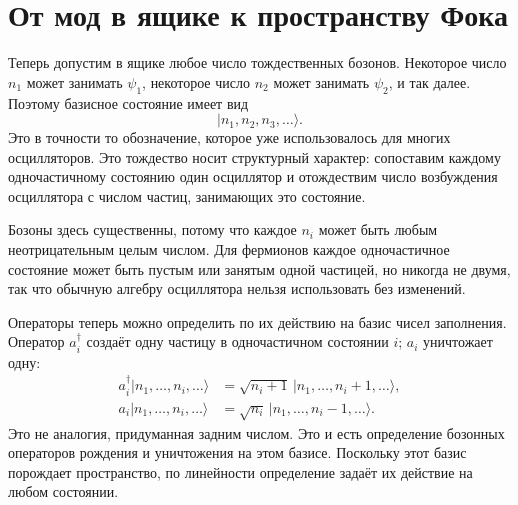 \begin{classroomqa}
\end{classroomqa}

\begin{classroomqa}
\end{classroomqa}

\section{От мод в ящике к пространству Фока}

Теперь допустим в ящике любое число тождественных бозонов. Некоторое число \(n_1\) может занимать \(\psi_1\), некоторое число \(n_2\) может занимать \(\psi_2\), и так далее. Поэтому базисное состояние имеет вид
\begin{equation}
|n_1,n_2,n_3,\ldots\rangle.
\end{equation}
Это в точности то обозначение, которое уже использовалось для многих осцилляторов. Это тождество носит структурный характер: сопоставим каждому одночастичному состоянию один осциллятор и отождествим число возбуждения осциллятора с числом частиц, занимающих это состояние.

Бозоны здесь существенны, потому что каждое \(n_i\) может быть любым неотрицательным целым числом. Для фермионов каждое одночастичное состояние может быть пустым или занятым одной частицей, но никогда не двумя, так что обычную алгебру осциллятора нельзя использовать без изменений.

Операторы теперь можно определить по их действию на базис чисел заполнения. Оператор \(a_i^\dagger\) создаёт одну частицу в одночастичном состоянии \(i\); \(a_i\) уничтожает одну:
\begin{align}
a_i^\dagger|n_1,\ldots,n_i,\ldots\rangle
&=\sqrt{n_i+1}\,|n_1,\ldots,n_i+1,\ldots\rangle, \\
a_i|n_1,\ldots,n_i,\ldots\rangle
&=\sqrt{n_i}\,|n_1,\ldots,n_i-1,\ldots\rangle.
\end{align}
Это не аналогия, придуманная задним числом. Это и есть определение бозонных операторов рождения и уничтожения на этом базисе. Поскольку этот базис порождает пространство, по линейности определение задаёт их действие на любом состоянии.

